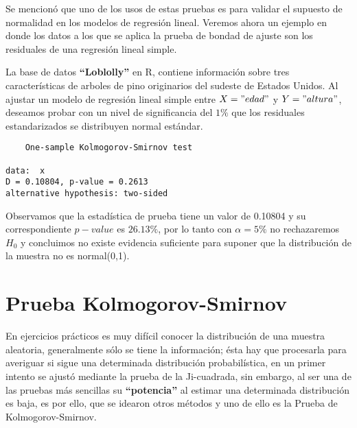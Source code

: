 \documentclass[
  a4paper,
  oneside,
  openany]{book}
\newenvironment{Shaded}{\begin{snugshade}}{\end{snugshade}}
\newcommand{\DecValTok}[1]{\textcolor[rgb]{0.00,0.00,0.81}{#1}}
\newcommand{\FunctionTok}[1]{\textcolor[rgb]{0.00,0.00,0.00}{#1}}
\newcommand{\NormalTok}[1]{#1}
\newcommand{\OtherTok}[1]{\textcolor[rgb]{0.56,0.35,0.01}{#1}}
\newcommand{\SpecialCharTok}[1]{\textcolor[rgb]{0.00,0.00,0.00}{#1}}
\newcommand{\StringTok}[1]{\textcolor[rgb]{0.31,0.60,0.02}{#1}}
\begin{document}
Se mencionó que uno de los usos de estas pruebas es para validar el supuesto de normalidad en los modelos de regresión lineal. Veremos ahora un ejemplo en donde los datos a los que se aplica la prueba de bondad de ajuste son los residuales de una regresión lineal simple.

La base de datos \textbf{``Loblolly''} en R, contiene información sobre tres características de arboles de pino originarios del sudeste de Estados Unidos. Al ajustar un modelo de regresión lineal simple entre \(X="edad"\) y \(Y="altura"\), deseamos probar con un nivel de significancia del \(1\%\) que los residuales estandarizados se distribuyen normal estándar.

\begin{Shaded}
\end{Shaded}

\begin{verbatim}
    One-sample Kolmogorov-Smirnov test

data:  x
D = 0.10804, p-value = 0.2613
alternative hypothesis: two-sided
\end{verbatim}

Observamos que la estadística de prueba tiene un valor de 0.10804 y su correspondiente \(p-value\) es \(26.13\%\), por lo tanto con \(\alpha=5\%\) no rechazaremos \(H_0\) y concluimos no existe evidencia suficiente para suponer que la distribución de la muestra no es normal(0,1).

\hypertarget{prueba-kolmogorov-smirnov}{%
\chapter{Prueba Kolmogorov-Smirnov}\label{prueba-kolmogorov-smirnov}}

En ejercicios prácticos es muy difícil conocer la distribución de una muestra aleatoria, generalmente
sólo se tiene la información; ésta hay que procesarla para averiguar si sigue una determinada distribución probabilística, en un primer intento se ajustó mediante la prueba de la Ji-cuadrada, sin embargo, al ser una de las pruebas más sencillas su \textbf{``potencia''} al estimar una determinada distribución es baja, es por ello, que se idearon otros métodos y uno de ello es la Prueba de Kolmogorov-Smirnov.
\end{document}
